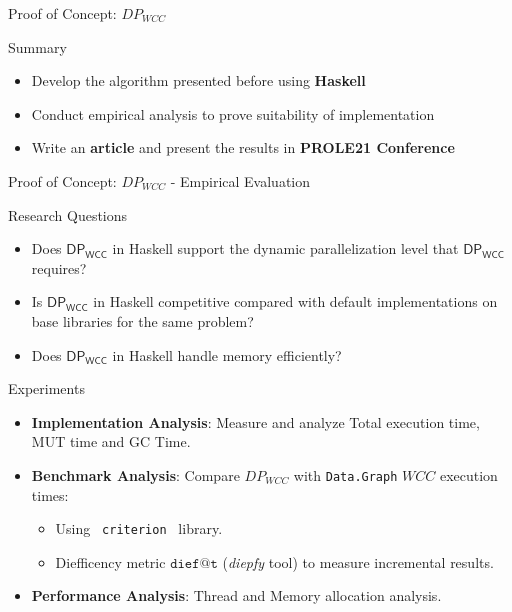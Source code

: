 \documentclass{beamer}
\newcommand{\dpwcc}{\mathsf{DP_{WCC}}}
\begin{document}
  \begin{frame}[fragile]{Proof of Concept: $DP_{WCC}$}
    \begin{block}{Summary}
    \begin{itemize}
      \item {\color{light}Develop the algorithm presented before using \textbf{Haskell}}
      \item {\color{light}Conduct empirical analysis to prove suitability of implementation}
      \item Write an \textbf{article} and present the results in \textbf{PROLE21 Conference}~\cite{prole:2021:017}
    \end{itemize}
    \end{block}
  \end{frame}
  
  \begin{frame}[fragile]{Proof of Concept: $DP_{WCC}$ - Empirical Evaluation}
    \begin{block}{Research Questions}
      \begin{itemize}
            \item Does $\dpwcc$ in Haskell support the dynamic parallelization level that $\dpwcc$ requires?
            \item Is $\dpwcc$ in Haskell competitive compared with default implementations on base libraries for the same problem?
            \item Does $\dpwcc$ in Haskell handle memory efficiently?
        \end{itemize}        
    \end{block}
    \begin{block}{Experiments}
      \begin{itemize}
        \item \textbf{Implementation Analysis}: Measure and analyze Total execution time, MUT time and GC Time.
        \item \textbf{Benchmark Analysis}: Compare $DP_{WCC}$ with \texttt{Data.Graph} $WCC$ execution times:
        \begin{itemize}
          \item Using \texttt{ criterion } library.
          \item Diefficency metric $\mathtt{dief@t}$ (\textit{diepfy} tool) to measure incremental results.
        \end{itemize}
        \item \textbf{Performance Analysis}: Thread and Memory allocation analysis.
      \end{itemize}
    \end{block}
  \end{frame}
\end{document}
